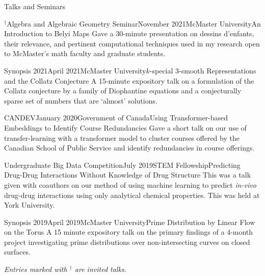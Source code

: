 \begin{rSection}{Talks and Seminars}

\begin{rSubsection}{$^\dagger$Algebra and Algebraic Geometry Seminar}{November 2021}{McMaster University}{An Introduction to Belyi Maps}
	Gave a 30-minute presentation on dessins d'enfants, their relevance, and pertinent computational techniques used in my research open to McMaster's math faculty and graduate students.
\end{rSubsection}
\smallskip

\begin{rSubsection}{Synopsis 2021}{April 2021}{McMaster University}{$k$-special $3$-smooth Representations and the Collatz Conjecture}
	A 15-minute expository talk on a formulation of the Collatz conjecture by a family of Diophantine equations and a conjecturally sparse set of numbers that are `almost' solutions.
\end{rSubsection}
\smallskip

\begin{rSubsection}{CANDEV}{January 2020}{Government of Canada}{Using Transformer-based Embeddings to  Identify Course Redundancies}
	Gave a short talk on our use of transfer-learning with a transformer model to cluster courses offered by the Canadian School of Public Service and identify redundancies in course offerings.
\end{rSubsection}
\smallskip

\begin{rSubsection}{Undergraduate Big Data Competition}{July 2019}{STEM Fellowship}{Predicting Drug-Drug Interactions Without Knowledge of Drug Structure}
	This was a talk given with coauthors on our method of using machine learning to predict \textit{in-vivo} drug-drug interactions using only analytical chemical properties. This was held at York University.
\end{rSubsection}
\smallskip

\begin{rSubsection}{Synopsis 2019}{April 2019}{McMaster University}{Prime Distribution by Linear Flow on the Torus}
	A 15 minute expository talk on the primary findings of a 4-month project investigating prime distributions over non-intersecting curves on closed surfaces.
\end{rSubsection}
\smallskip



{\em Entries marked with $^\dagger$ are invited talks.}


\end{rSection}
